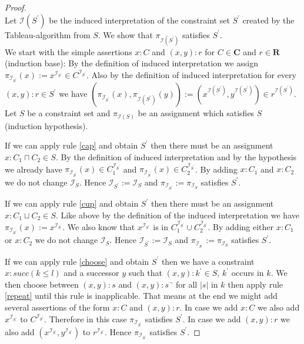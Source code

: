 \documentclass[a4paper,11pt]{scrartcl}
\theoremstyle{break}
\theoremstyle{definition}
\begin{document}
\begin{proof}$ $\\
Let $\mathcal{I}(S^\prime)$ be the induced interpretation of the constraint set $S^\prime$ created by the Tableau-algorithm from $S$. We show that $\pi_{\mathcal{I}(S^\prime)}$ satisfies $S^\prime$.\\
We start with the simple assertions $x:C$ and $(x,y):r$ for $C\in\mathbf{C}$ and $r\in\mathbf{R}$ (induction base): By the definition of induced interpretation we assign $\pi_{\mathcal{I}_{S^\prime}}(x):=x^{\mathcal{I}_{S^\prime}}\in C^{\mathcal{I}_{S^\prime}}$. Also by the definition of induced interpretation for every $(x,y):r\in S^\prime$ we have $(\pi_{\mathcal{I}_{S^\prime}}(x),\pi_{\mathcal{I}(S^\prime)}(y)):=(x^{\mathcal{I}(S^\prime)},y^{\mathcal{I}(S^\prime)})\in r^{\mathcal{I}(S^\prime)}$.\\
Let $S$ be a constraint set and $\pi_{\mathcal{I}(S)}$ be an assignment which satisfies $S$ (induction hypothesis).\par
If we can apply rule \ref{cap} and obtain $S^\prime$ then there must be an assignment $x:C_1\sqcap C_2\in S$. By the definition of induced interpretation and by the hypothesis we already have $\pi_{\mathcal{I}_{S^\prime}}(x)\in C_1^{\mathcal{I}_{S^\prime}}$ and $\pi_{\mathcal{I}_{S^\prime}}(x)\in C_2^{\mathcal{I}_{S^\prime}}$. By adding $x:C_1$ and $x:C_2$ we do not change $\mathcal{I}_S$. Hence $\mathcal{I}_{S^\prime}:=\mathcal{I}_S$ and $\pi_{\mathcal{I}_{S^\prime}}:=\pi_{\mathcal{I}_S}$ satisfies $S^\prime$.\par
If we can apply rule \ref{cup} and obtain $S^\prime$ then there must be an assignment $x:C_1\sqcup C_2\in S$. Like above by the definition of the induced interpretation we have $\pi_{\mathcal{I}_{S^\prime}}(x):=x^{\mathcal{I}_{S^\prime}}$. We also know that $x^{\mathcal{I}_{S^\prime}}$ is in $C_1^{\mathcal{I}_{S^\prime}}\cup C_2^{\mathcal{I}_{S^\prime}}$. By adding either $x:C_1$ or $x:C_2$ we do not change $\mathcal{I}_S$. Hence $\mathcal{I}_{S^\prime}:=\mathcal{I}_S$ and $\pi_{\mathcal{I}_{S^\prime}}:=\pi_{\mathcal{I}_S}$ satisfies $S^\prime$.\par
If we can apply rule \ref{choose} and obtain $S^\prime$ then we have a constraint $x:succ(k\leq l)$ and a successor $y$ such that $(x,y):k^\prime\in S$, $k^\prime$ occurs in $k$. We then choose between $(x,y):s$ and $(x,y):s^\neg$ for all $|s|$ in $k$ then apply rule \ref{repeat} until this rule is inapplicable. That means at the end we might add several assertions of the form $x:C$ and $(x,y):r$. In case we add $x:C$ we also add $x^{\mathcal{I}_{S^\prime}}$ to $C^{\mathcal{I}_{S^\prime}}$. Therefore in this case $\pi_{\mathcal{I}_{S^\prime}}$ satisfies $S^\prime$. In case we add $(x,y):r$ we also add $(x^{\mathcal{I}_{S^\prime}},y^{\mathcal{I}_{S^\prime}})$ to $r^{\mathcal{I}_{S^\prime}}$. Hence $\pi_{\mathcal{I}_{S^\prime}}$ satisfies $S^\prime$.\par

\end{proof}
\end{document}
